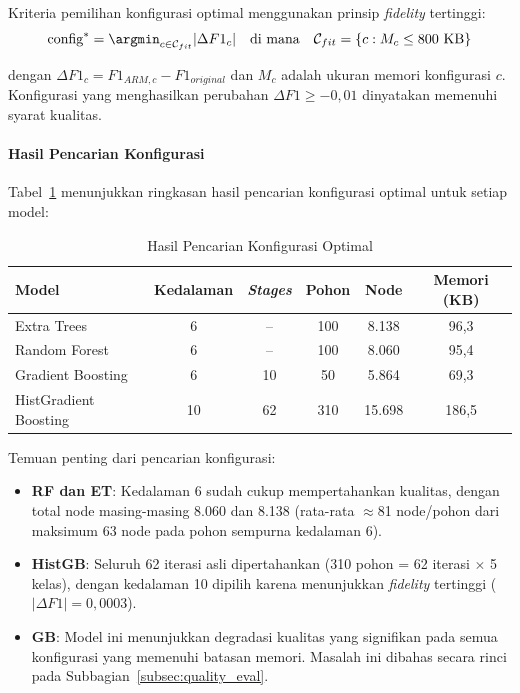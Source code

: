 Kriteria pemilihan konfigurasi optimal menggunakan prinsip \textit{fidelity} tertinggi:
\begin{equation}
    \text{config}^{*} = \argmin_{c \in \mathcal{C}_{fit}} |\Delta F1_c|
    \quad \text{di mana} \quad
    \mathcal{C}_{fit} = \{c : M_c \leq 800 \text{ KB}\}
\end{equation}

dengan $\Delta F1_c = F1_{ARM,c} - F1_{original}$ dan $M_c$ adalah ukuran memori konfigurasi $c$. Konfigurasi yang menghasilkan perubahan $\Delta F1 \geq -0{,}01$ dinyatakan memenuhi syarat kualitas.

\paragraph{Hasil Pencarian Konfigurasi}
Tabel~\ref{tab:depth_search_results} menunjukkan ringkasan hasil pencarian konfigurasi optimal untuk setiap model:

\begin{table}[htbp]
\centering
\caption{Hasil Pencarian Konfigurasi Optimal}
\label{tab:depth_search_results}
\begin{tabular}{lccccc}
\hline
\textbf{Model} & \textbf{Kedalaman} & \textbf{\textit{Stages}} & \textbf{Pohon} & \textbf{Node} & \textbf{Memori (KB)} \\
\hline
Extra Trees & 6 & -- & 100 & 8.138 & 96,3 \\
Random Forest & 6 & -- & 100 & 8.060 & 95,4 \\
Gradient Boosting & 6 & 10 & 50 & 5.864 & 69,3 \\
HistGradient Boosting & 10 & 62 & 310 & 15.698 & 186,5 \\
\hline
\end{tabular}
\end{table}

Temuan penting dari pencarian konfigurasi:
\begin{itemize}
    \item \textbf{RF dan ET}: Kedalaman 6 sudah cukup mempertahankan kualitas, dengan total node masing-masing 8.060 dan 8.138 (rata-rata $\approx$81 node/pohon dari maksimum 63 node pada pohon sempurna kedalaman 6).
    \item \textbf{HistGB}: Seluruh 62 iterasi asli dipertahankan (310 pohon = 62 iterasi $\times$ 5 kelas), dengan kedalaman 10 dipilih karena menunjukkan \textit{fidelity} tertinggi ($|\Delta F1| = 0{,}0003$).
    \item \textbf{GB}: Model ini menunjukkan degradasi kualitas yang signifikan pada semua konfigurasi yang memenuhi batasan memori. Masalah ini dibahas secara rinci pada Subbagian~\ref{subsec:quality_eval}.
\end{itemize}

